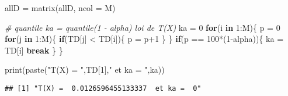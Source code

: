 \documentclass[
]{article}
\newenvironment{Shaded}{\begin{snugshade}}{\end{snugshade}}
\newcommand{\AttributeTok}[1]{\textcolor[rgb]{0.77,0.63,0.00}{#1}}
\newcommand{\CommentTok}[1]{\textcolor[rgb]{0.56,0.35,0.01}{\textit{#1}}}
\newcommand{\ControlFlowTok}[1]{\textcolor[rgb]{0.13,0.29,0.53}{\textbf{#1}}}
\newcommand{\DecValTok}[1]{\textcolor[rgb]{0.00,0.00,0.81}{#1}}
\newcommand{\FunctionTok}[1]{\textcolor[rgb]{0.00,0.00,0.00}{#1}}
\newcommand{\NormalTok}[1]{#1}
\newcommand{\OtherTok}[1]{\textcolor[rgb]{0.56,0.35,0.01}{#1}}
\newcommand{\SpecialCharTok}[1]{\textcolor[rgb]{0.00,0.00,0.00}{#1}}
\newcommand{\StringTok}[1]{\textcolor[rgb]{0.31,0.60,0.02}{#1}}
\begin{document}
\begin{Shaded}
\begin{Highlighting}[]
\NormalTok{allD }\OtherTok{=} \FunctionTok{matrix}\NormalTok{(allD, }\AttributeTok{ncol =}\NormalTok{ M)}

\CommentTok{\# quantile ka = quantile(1 {-} alpha) loi  de T(X)}
\NormalTok{ka }\OtherTok{=} \DecValTok{0}
\ControlFlowTok{for}\NormalTok{(i }\ControlFlowTok{in} \DecValTok{1}\SpecialCharTok{:}\NormalTok{M)\{}
\NormalTok{  p }\OtherTok{=} \DecValTok{0}
  \ControlFlowTok{for}\NormalTok{(j }\ControlFlowTok{in} \DecValTok{1}\SpecialCharTok{:}\NormalTok{M)\{}
    \ControlFlowTok{if}\NormalTok{(TD[j] }\SpecialCharTok{\textless{}}\NormalTok{ TD[i])\{}
\NormalTok{      p }\OtherTok{=}\NormalTok{ p}\SpecialCharTok{+}\DecValTok{1}
\NormalTok{    \}}
\NormalTok{  \}}
  \ControlFlowTok{if}\NormalTok{(p }\SpecialCharTok{==} \DecValTok{100}\SpecialCharTok{*}\NormalTok{(}\DecValTok{1}\SpecialCharTok{{-}}\NormalTok{alpha))\{}
\NormalTok{    ka }\OtherTok{=}\NormalTok{ TD[i]}
    \ControlFlowTok{break}
\NormalTok{  \}}
\NormalTok{\}}

\FunctionTok{print}\NormalTok{(}\FunctionTok{paste}\NormalTok{(}\StringTok{"T(X) = "}\NormalTok{,TD[}\DecValTok{1}\NormalTok{],}\StringTok{" et ka = "}\NormalTok{,ka))}
\end{Highlighting}
\end{Shaded}

\begin{verbatim}
## [1] "T(X) =  0.0126596455133337  et ka =  0"
\end{verbatim}
\end{document}
